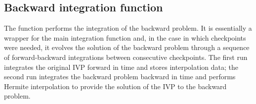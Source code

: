 \subsection{Backward integration function}\label{sss:cvodeb}

The function  performs the integration of the backward problem.
It is essentially a wrapper for the {\cvodes} main integration function 
 and, in the case in which checkpoints were needed, it evolves 
the solution of the backward problem through a sequence of forward-backward 
integrations between consecutive checkpoints. 
The first run integrates the original IVP forward in time and
stores interpolation data; the second run integrates the backward problem 
backward in time and performs Hermite interpolation to provide
the solution of the IVP to the backward problem.

